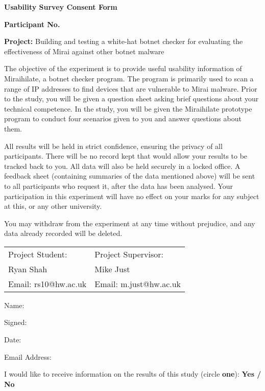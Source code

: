 \begin{center}
	\textbf{Usability Survey Consent Form}\par
	\textbf{Participant No.}\par
	\textbf{Project:} Building and testing a white-hat botnet checker for evaluating the effectiveness of Mirai against other botnet malware
\end{center}

The objective of the experiment is to provide useful usability information of Miraihilate, a botnet checker program. The program is primarily used to scan a range of IP addresses to find devices that are vulnerable to Mirai malware. Prior to the study, you will be given a question sheet asking brief questions about your technical competence. In the study, you will be given the Miraihilate prototype program to conduct four scenarios given to you and answer questions about them.

\vspace{0.5cm}

All results will be held in strict confidence, ensuring the privacy of all participants. There will be no record kept that would allow your results to be tracked back to you. All data will also be held securely in a locked office. A feedback sheet (containing summaries of the data mentioned above) will be sent to all participants who request it, after the data has been analysed. Your participation in this experiment will have no effect on your marks for any subject at this, or any other university.

\vspace{0.5cm}

You may withdraw from the experiment at any time without prejudice, and any data already recorded will be deleted.

\vspace{0.5cm}

\begin{table}[h]
\centering
\begin{tabular}{ll}
\hline
Project Student:     & Project Supervisor:    \\
Ryan Shah            & Mike Just              \\
Email: rs10@hw.ac.uk & Email: m.just@hw.ac.uk \\ \hline
\end{tabular}
\end{table}

Name:\par
Signed:\par
Date:\par
Email Address:\par

\vspace{0.5cm}

I would like to receive information on the results of this study (circle \textbf{one}): \textbf{Yes / No}
